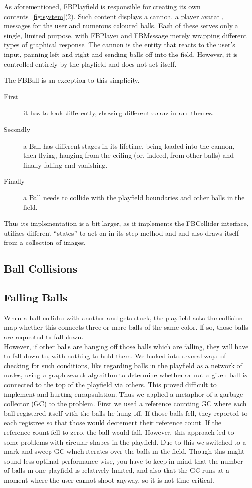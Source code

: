 As aforementioned, FBPlayfield is responsible for creating its own 
contents~\ref{fig:system}(2). Such content displays a cannon, a 
player avatar , messages for the user and numerous coloured balls. 
Each of these serves only a single, limited purpose, with FBPlayer 
and FBMessage merely wrapping different types of graphical response.
The cannon is the entity that reacts to the user's input, panning 
left and right and sending balls off into the field. However, it 
is controlled entirely by the playfield and does not act itself.

The FBBall is an exception to this simplicity. 
\begin{description}
  \item[First]
    	it has to look 
	differently, showing different colors in our themes. 
  \item[Secondly]
    	a Ball has different stages in its lifetime, being 
	loaded into the cannon, then flying, hanging from the 
	ceiling (or, indeed, from other balls) and finally falling 
	and vanishing.
  \item[Finally]
    	a Ball needs to collide with the playfield boundaries and 
	other balls in the field.
\end{description}
%
Thus its implementation is a bit larger, as it implements the FBCollider 
interface, utilizes different ``states'' to act on in its step method and 
and also draws itself from a collection of images.
%
\subsection{Ball Collisions}
%
\subsection{Falling Balls}
%
When a ball collides with another and gets stuck, the playfield asks the 
collision map whether this connects three or more balls of the same color.
If so, those balls are requested to fall down.\\
However, if other balls are hanging off those balls which are falling, 
they will have to fall down to, with nothing to hold them. We looked 
into several ways of checking for such conditions, like regarding balls in the 
playfield as a network of nodes, using a graph search algorithm to determine 
whether or not a given ball is connected to the top of the playfield via 
others. This proved difficult to implement and hurting encapsulation. Thus 
we applied a metaphor of a garbage collector (GC) to the problem. First we used a
reference counting GC where each ball registered itself with the balls he hung 
off. If those balls fell, they reported to each registree so that those would 
decrement their reference count. If the reference count fell to zero, the ball 
would fall. However, this approach led to some problems with circular shapes 
in the playfield. Due to this we switched to a mark and sweep GC which iterates 
over the balls in the field. Though this might sound less optimal performance-wise,
you have to keep in mind that the number of balls in one playfield is relatively limited, 
and also that the GC runs at a moment where the user cannot shoot anyway, so 
it is not time-critical.

